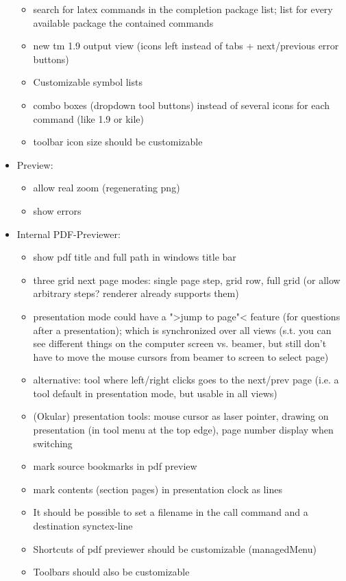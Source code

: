 \documentclass[10pt,a4paper,portrait]{article}
\begin{document}
\begin{itemize}
\begin{itemize}
		\item search for latex commands in the completion package list; list for every available package the contained commands
		\item new tm 1.9 output view (icons left instead of tabs + next/previous error buttons)
		\item Customizable symbol lists
		\item combo boxes (dropdown tool buttons) instead of several icons for each command (like 1.9 or kile)
		\item toolbar icon size should be customizable
	\end{itemize}
	\item Preview: \begin{itemize}
	\item allow real zoom (regenerating png)
	\item show errors
	\end{itemize}
	\item Internal PDF-Previewer: \begin{itemize}
	\item  show pdf title and full path in windows title bar
	\item three grid next page modes: single page step, grid row, full grid (or allow arbitrary steps? renderer already supports them)
	\item presentation mode could have a ">jump to page"< feature (for questions after a presentation); which is synchronized over all views (s.t. you can see different things on the computer screen vs. beamer, but still don't have to move the mouse cursors from beamer to screen to select page)
	\item alternative: tool where left/right clicks goes to the next/prev page (i.e. a tool default in presentation mode, but usable in all views)
	\item (Okular) presentation tools: mouse cursor as laser pointer, drawing on presentation (in tool menu at the top edge), page number display when switching
	\item mark source bookmarks in pdf preview 
	\item mark contents (section pages) in presentation clock as lines
	\item It should be possible to set a filename in the call command and a destination synctex-line
	\item Shortcuts of pdf previewer should be customizable (managedMenu)
	\item Toolbars should also be customizable

\end{itemize}
\end{itemize}
\end{document}
